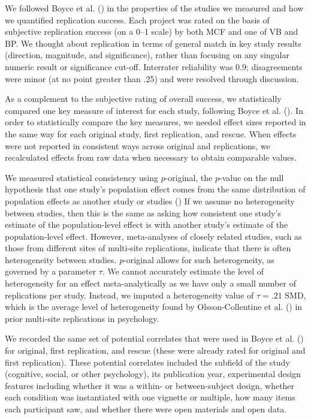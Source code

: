\documentclass[
  english,
  a4paper,
]{article}
\begin{document}
We followed Boyce et al. () in the properties of the studies we measured and how we quantified replication success.
Each project was rated on the basis of subjective replication success (on a 0--1 scale) by both MCF and one of VB and BP.
We thought about replication in terms of general match in key study results (direction, magnitude, and significance), rather than focusing on any singular numeric result or significance cut-off.
Interrater reliability was 0.9; disagreements were minor (at no point greater than .25) and were resolved through discussion.

As a complement to the subjective rating of overall success, we statistically compared one key measure of interest for each study, following Boyce et al. ().
In order to statistically compare the key measures, we needed effect sizes reported in the same way for each original study, first replication, and rescue.
When effects were not reported in consistent ways across original and replications, we recalculated effects from raw data when necessary to obtain comparable values.

We measured statistical consistency using \(p\)-original, the \(p\)-value on the null hypothesis that one study's population effect comes from the same distribution of population effects as another study or studies () If we assume no heterogeneity between studies, then this is the same as asking how consistent one study's estimate of the population-level effect is with another study's estimate of the population-level effect.
However, meta-analyses of closely related studies, such as those from different sites of multi-site replications, indicate that there is often heterogeneity between studies.
\(p\)-original allows for such heterogeneity, as governed by a parameter \(\tau\).
We cannot accurately estimate the level of heterogeneity for an effect meta-analytically as we have only a small number of replications per study.
Instead, we imputed a heterogeneity value of \(\tau=.21\) SMD, which is the average level of heterogeneity found by Olsson-Collentine et al. () in prior multi-site replications in psychology.

We recorded the same set of potential correlates that were used in Boyce et al. () for original, first replication, and rescue (these were already rated for original and first replication).
These potential correlates included the subfield of the study (cognitive, social, or other psychology), its publication year, experimental design features including whether it was a within- or between-subject design, whether each condition was instantiated with one vignette or multiple, how many items each participant saw, and whether there were open materials and open data.
\end{document}
